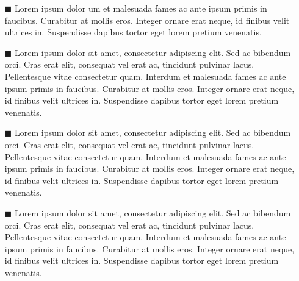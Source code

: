 \documentclass[./main.tex]{subfiles}
\begin{document}
\begin{itemize}
    \item[$\blacksquare$] Lorem ipsum dolor um et malesuada fames ac ante ipsum primis in faucibus. Curabitur at mollis eros. Integer ornare erat neque, id finibus velit ultrices in. Suspendisse dapibus tortor eget lorem pretium venenatis.
    \item[$\blacksquare$] Lorem ipsum dolor sit amet, consectetur adipiscing elit. Sed ac bibendum orci. Cras erat elit, consequat vel erat ac, tincidunt pulvinar lacus. Pellentesque vitae consectetur quam. Interdum et malesuada fames ac ante ipsum primis in faucibus. Curabitur at mollis eros. Integer ornare erat neque, id finibus velit ultrices in. Suspendisse dapibus tortor eget lorem pretium venenatis.
    \item[$\blacksquare$] Lorem ipsum dolor sit amet, consectetur adipiscing elit. Sed ac bibendum orci. Cras erat elit, consequat vel erat ac, tincidunt pulvinar lacus. Pellentesque vitae consectetur quam. Interdum et malesuada fames ac ante ipsum primis in faucibus. Curabitur at mollis eros. Integer ornare erat neque, id finibus velit ultrices in. Suspendisse dapibus tortor eget lorem pretium venenatis.
    \item[$\blacksquare$] Lorem ipsum dolor sit amet, consectetur adipiscing elit. Sed ac bibendum orci. Cras erat elit, consequat vel erat ac, tincidunt pulvinar lacus. Pellentesque vitae consectetur quam. Interdum et malesuada fames ac ante ipsum primis in faucibus. Curabitur at mollis eros. Integer ornare erat neque, id finibus velit ultrices in. Suspendisse dapibus tortor eget lorem pretium venenatis.
\end{itemize}
\end{document}
